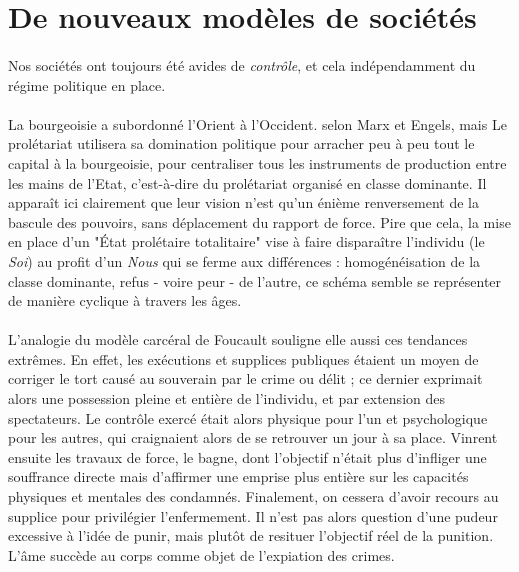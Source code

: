 \section{De nouveaux modèles de sociétés}

\paragraph{} Nos sociétés ont toujours été avides de \emph{contrôle}, et cela indépendamment du régime politique en 
place. 

\paragraph{} \guillemotleft La bourgeoisie a subordonné l'Orient à l'Occident. \guillemotright selon Marx et Engels,
mais \guillemotleft Le prolétariat utilisera sa domination politique pour arracher peu à peu tout le capital à la
bourgeoisie, pour centraliser tous les instruments de production entre les mains de l'Etat, c'est-à-dire du prolétariat
organisé en classe dominante.\guillemotright \cite{Marx1} Il apparaît ici clairement que leur vision
n'est qu'un énième renversement de la bascule des pouvoirs, sans déplacement du rapport de force. Pire que cela, la mise
en place d'un "État prolétaire totalitaire" vise à faire disparaître l'individu (le \emph{Soi}) au profit d'un \emph{Nous}
qui se ferme aux différences : homogénéisation de la classe dominante, refus - voire peur - de l'autre, ce schéma semble
se représenter de manière cyclique à travers les âges.

\paragraph{} L'analogie du modèle carcéral de Foucault souligne elle aussi ces tendances extrêmes.
En effet, les exécutions et supplices publiques étaient un moyen de corriger le tort causé au souverain par le crime ou
délit ; ce dernier exprimait alors une possession pleine et entière de l'individu, et par extension des spectateurs. 
Le contrôle exercé était alors physique pour l'un et psychologique pour les autres, qui craignaient alors de se
retrouver un jour à sa place. Vinrent ensuite les travaux de force, le bagne, dont l'objectif n'était plus d'infliger
une souffrance directe mais d'affirmer une emprise plus entière sur les capacités physiques et mentales des condamnés.
Finalement, on cessera d'avoir recours au supplice pour privilégier l'enfermement. Il n'est pas alors question d'une
pudeur excessive à l'idée de punir, mais plutôt de resituer l'objectif réel de la punition.
\guillemotleft L'âme succède au corps comme objet de l'expiation des crimes. \guillemotright \cite{Foucault0}

